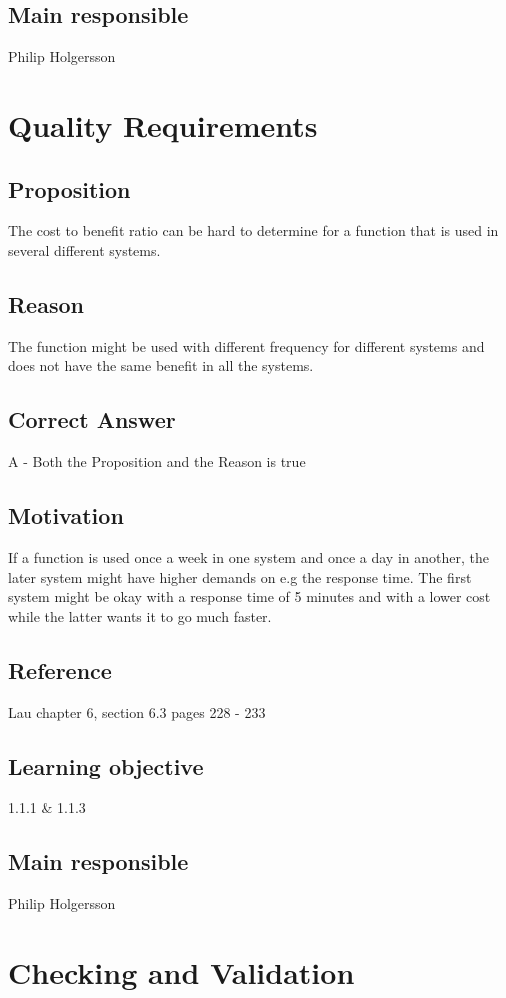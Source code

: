 \documentclass[a4paper]{article}
\begin{document}
\subsection*{Main responsible}
Philip Holgersson



\section{Quality Requirements}
\subsection*{Proposition}
The cost to benefit ratio can be hard to determine for a function that is used in several different systems.
\subsection*{Reason}
The function might be used with different frequency for different systems and does not have the same benefit in all the systems.
\subsection*{Correct Answer}
A - Both the Proposition and the Reason is true
\subsection*{Motivation}
If a function is used once a week in one system and once a day in another, the later system might have higher demands on e.g the response time. The first system might be okay with a response time of 5 minutes and with a lower cost while the latter wants it to go much faster. 
\subsection*{Reference}
Lau chapter 6, section 6.3 pages 228 - 233
\subsection*{Learning objective}
1.1.1 \& 1.1.3
\subsection*{Main responsible}
Philip Holgersson



\section{Checking and Validation}
\end{document}
